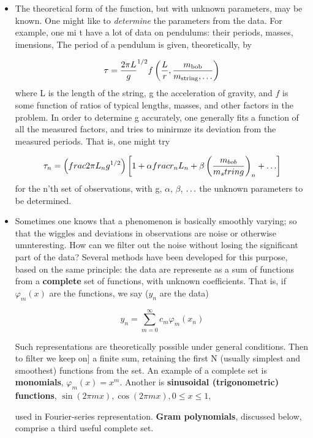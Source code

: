 \begin{itemize}
    \item The theoretical form of the function, but with unknown parameters, may be known. One might like to \textit{determine} the parameters from the data. For example, one mi t have a lot of data on pendulums: their periods, masses, imensions, \etc The period of a pendulum is given, theoretically, by
    
    \begin{equation}
    \tau = \frac{2\pi L}{g}^{1/2} f\left( \frac{L}{r},\frac{m_{\text{bob}}}{m_{\text{string}},\mathellipsis}\right)
    \end{equation}
    where L is the length of the string, g the acceleration of gravity, and $f$ is some function of ratios of typical lengths, masses, and other factors in the problem. In order to determine g accurately, one generally fits a function of all the measured factors, and tries to minirmze its deviation from the measured periods. That is, one might try
    
    \begin{equation}
    \tau_{n} = \left(frac{2\pi L_{n}}{g}^{1/2}\right) \left[ 1 + \alpha frac{r_{n}}{L_{n}} + \beta\left(\frac{m_{bob}}{m_string}\right)_{n} + \mathellipsis\right]
    \end{equation}
    for the n'th set of observations, with g, $\alpha$, $\beta$, $\mathellipsis$ the unknown parameters to be determined.
    
    \item Sometimes one knows that a phenomenon is basically smoothly varying; so that the wiggles and deviations in observations are noise or otherwise umnteresting. How can we filter out the noise without losing the significant part of the data? Several methods have been developed for this purpose, based on the same principle: the data are represente as a sum of functions from a \textbf{complete} set of functions, with unknown coefficients. That is, if $\varphi_{m}(x)$ are the functions, we say ($y_n$ are the data)

    \begin{equation}
    y_n = \sum_{m=0}^{\infty}c_{m}\varphi_{m}(x_{n})
    \end{equation}

    Such representations are theoretically possible under general conditions. Then to filter we keep on] a finite sum, retaining the first N (usually simplest and smoothest) functions from the set. An example of a complete set is \textbf{monomials}, $\varphi_{m}(x) = x^{m}$. Another is \textbf{sinusoidal (trigonometric) functions},
        $\sin(2\pi mx), \cos(2\pi mx), 0 \leq x \leq 1$,
    
    used in Fourier-series representation. \textbf{Gram polynomials}, discussed below, comprise a third useful complete set.
\end{itemize}

